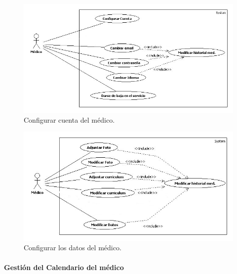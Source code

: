 				\begin{figure}[H]
				  \centering
				    \includegraphics[width=15cm]{img/jpg/casos_uso/Configurar_Cuenta_Medico.jpg}
				  \caption{Configurar cuenta del médico.}
				  \label{fig:config_med_cuenta}
				\end{figure}
				
				\bigskip
				
				\begin{figure}[H]
				  \centering
				    \includegraphics[width=15cm]{img/jpg/casos_uso/Configurar_Datos_Medico.jpg}
				  \caption{Configurar los datos del médico.}
				  \label{fig:config_med_datos}
				\end{figure}
		
			\bigskip
			\bigskip
			\paragraph{Gestión del Calendario del médico} %
			\label{par:gestion_del_calendario_del_medico}
			
